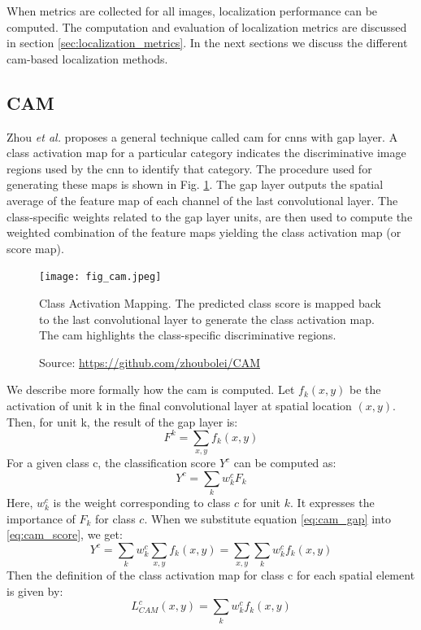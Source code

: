 When metrics are collected for all images, localization performance can be computed. The computation and evaluation of localization metrics are discussed in section \ref{sec:localization_metrics}. In the next sections we discuss the different \acrshort{cam}-based localization methods.

\subsection{CAM} \label{sec:cam}
Zhou \textit{et al.} proposes a general technique called \acrfull{cam} for \acrshort{cnn}s with \acrshort{gap} layer. A class activation map for a particular category indicates the discriminative image regions used by the
\acrshort{cnn} to identify that category. The procedure used for generating these maps is shown in Fig. \ref{fig:cam}. The \acrshort{gap} layer outputs the spatial average of the feature map of each channel of the last convolutional layer. The class-specific weights related to the \acrshort{gap} layer units, are then used to compute the weighted combination of the feature maps yielding the class activation map (or score map).

\begin{figure}[h]
    \begin{center}       
    \texttt{[image: fig\_cam.jpeg]}
    \caption[Class Activation Mapping]{Class Activation Mapping. The predicted class score is mapped back to the last convolutional layer to generate the class activation map. The \acrshort{cam} highlights the class-specific discriminative regions.}
    \caption*{Source: \href{https://github.com/zhoubolei/CAM}{https://github.com/zhoubolei/CAM}}
    \label{fig:cam}
    \end{center}
\end{figure}

We describe more formally how the \acrshort{cam} is computed. Let $f_{k}(x,y)$ be the activation of unit k in the final convolutional layer at spatial location $(x,y)$. Then, for unit k, the result of the \acrshort{gap} layer is:
\begin{equation} \label{eq:cam_gap}
    F^{k} = \sum_{x,y}f_{k}(x,y)
\end{equation}
For a given class c, the classification score $Y^{c}$ can be computed as:
\begin{equation} \label{eq:cam_score}
    Y^{c} = \sum_{k}w_{k}^{c}F_{k}
\end{equation}
Here, $w_{k}^{c}$ is the weight corresponding to class $c$ for unit $k$. It expresses the importance of $F_{k}$ for class $c$.
When we substitute equation \ref{eq:cam_gap} into \ref{eq:cam_score}, we get:
\begin{equation} \label{eq:cam_score2}
    Y^{c} = \sum_{k}w_{k}^{c}\sum_{x,y}f_{k}(x,y) = \sum_{x,y}\sum_{k}w_{k}^{c}f_{k}(x,y)
\end{equation}
Then the definition of the class activation map for class c for each spatial element is given by:
\begin{equation} \label{eq:cam_map}
    L_{CAM}^{c}(x,y) = \sum_{k}w_{k}^{c}f_{k}(x,y)
\end{equation}

